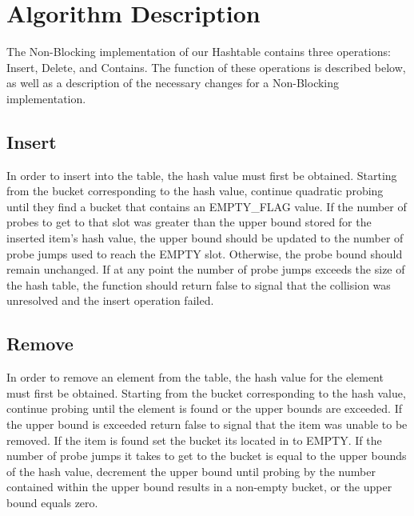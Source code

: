 \documentclass[journal]{IEEEtran}
\begin{document}


\section{Algorithm Description}

The Non-Blocking implementation of our Hashtable contains three operations: Insert, Delete, and Contains. The function of these operations is described below, as well as a description of the necessary changes for a Non-Blocking implementation.

\subsection{Insert}
In order to insert into the table, the hash value must first be obtained. Starting from the bucket corresponding to the hash value, continue quadratic probing until they find a bucket that contains an EMPTY\_FLAG value. If the number of probes to get to that slot was greater than the upper bound stored for the inserted item's hash value, the upper bound should be updated to the number of probe jumps used to reach the EMPTY slot. Otherwise, the probe bound should remain unchanged. If at any point the number of probe jumps exceeds the size of the hash table, the function should return false to signal that the collision was unresolved and the insert operation failed.

\subsection{Remove}
In order to remove an element from the table, the hash value for the element must first be obtained. Starting from the bucket corresponding to the hash value, continue probing until the element is found or the upper bounds are exceeded. If the upper bound is exceeded return false to signal that the item was unable to be removed. If the item is found set the bucket its located in to EMPTY. If the number of probe jumps it takes to get to the bucket is equal to the upper bounds of the hash value, decrement the upper bound until probing by the number contained within the upper bound results in a non-empty bucket, or the upper bound equals zero.
\end{document}
